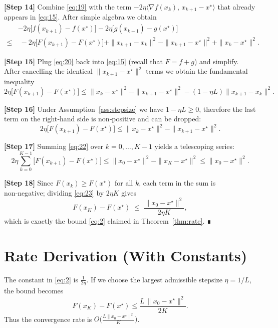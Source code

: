 \documentclass{article}
\begin{document}
\noindent\textbf{[Step 14]} Combine \eqref{eq:19} with the term $-2\eta\langle\nabla f(x_{k}),\,x_{k+1}-x^{\star}\rangle$ that already appears in \eqref{eq:15}.  After simple algebra we obtain
\[
\begin{aligned}
&-2\eta\bigl[f(x_{k+1})-f(x^{\star})\bigr]
-2\eta\bigl[g(x_{k+1})-g(x^{\star})\bigr] \\
\le &\; -2\eta\bigl[F(x_{k+1})-F(x^{\star})\bigr]
+ \|x_{k+1}-x_{k}\|^{2}
-\|x_{k+1}-x^{\star}\|^{2}
+\|x_{k}-x^{\star}\|^{2}.
\end{aligned}
\tag{20}
\]

\noindent\textbf{[Step 15]} Plug \eqref{eq:20} back into \eqref{eq:15} (recall that $F=f+g$) and simplify.  After cancelling the identical $\|x_{k+1}-x^{\star}\|^{2}$ terms we obtain the fundamental inequality
\[
2\eta\bigl[F(x_{k+1})-F(x^{\star})\bigr]
\le \|x_{k}-x^{\star}\|^{2}-\|x_{k+1}-x^{\star}\|^{2}
-(1-\eta L)\|x_{k+1}-x_{k}\|^{2}.
\tag{21}
\]

\noindent\textbf{[Step 16]} Under Assumption~\ref{ass:stepsize} we have $1-\eta L\ge0$, therefore the last term on the right‑hand side is non‑positive and can be dropped:
\[
2\eta\bigl[F(x_{k+1})-F(x^{\star})\bigr]
\le \|x_{k}-x^{\star}\|^{2}-\|x_{k+1}-x^{\star}\|^{2}.
\tag{22}
\]

\noindent\textbf{[Step 17]} Summing \eqref{eq:22} over $k=0,\dots,K-1$ yields a telescoping series:
\[
2\eta\sum_{k=0}^{K-1}\bigl[F(x_{k+1})-F(x^{\star})\bigr]
\le \|x_{0}-x^{\star}\|^{2}-\|x_{K}-x^{\star}\|^{2}
\le \|x_{0}-x^{\star}\|^{2}.
\tag{23}
\]

\noindent\textbf{[Step 18]} Since $F(x_{k})\ge F(x^{\star})$ for all $k$, each term in the sum is non‑negative; dividing \eqref{eq:23} by $2\eta K$ gives
\[
F(x_{K})-F(x^{\star})\;\le\;\frac{\|x_{0}-x^{\star}\|^{2}}{2\eta K},
\]
which is exactly the bound \eqref{eq:2} claimed in Theorem~\ref{thm:rate}. ∎

\section*{Rate Derivation (With Constants)}
The constant in \eqref{eq:2} is $\frac{1}{2\eta}$.
If we choose the largest admissible stepsize $\eta=1/L$, the bound becomes
\[
F(x_{K})-F(x^{\star})\le\frac{L\,\|x_{0}-x^{\star}\|^{2}}{2K}.
\]
Thus the convergence rate is $O\!\bigl(\tfrac{L\|x_{0}-x^{\star}\|^{2}}{K}\bigr)$.
\end{document}
